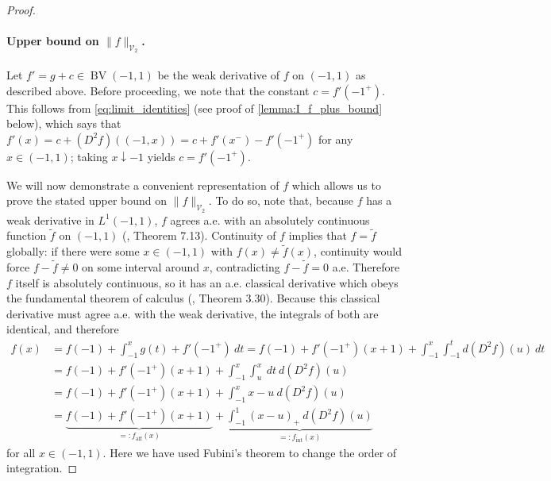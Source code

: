 \documentclass{article}
\DeclareMathOperator{\BV}{BV}
\def\cV{{\mathcal{V}}}
\begin{document}
\begin{appendices}
\begin{proof}
    \paragraph{Upper bound on $\| f \|_{\cV_2}$.} Let $f' = g+c \in \BV(-1,1)$ be the weak derivative of $f$ on $(-1,1)$ as described above. Before proceeding, we note that the constant $c = f'(-1^{+})$. This follows from \eqref{eq:limit_identities} (see proof of \cref{lemma:I_f_plus_bound} below), which says that $f'(x) = c + (D^2 f)((-1,x)) = c + f'(x^{-}) - f'(-1^{+})$ for any $x \in (-1,1)$; taking $x \downarrow -1$ yields $c = f'(-1^{+})$.

    We will now demonstrate a convenient representation of $f$ which allows us to prove the stated upper bound on $\| f \|_{\cV_2}$. To do so, note that, because $f$ has a weak derivative in $L^1(-1,1)$, $f$ agrees a.e. with an absolutely continuous function $\tilde{f}$ on $(-1,1)$ (\cite{leoni2017first}, Theorem 7.13). Continuity of $f$ implies that $f = \tilde{f}$ globally: if there were some $x \in (-1,1)$ with $f(x) \neq \tilde{f}(x)$, continuity would force $f - \tilde{f} \neq 0$ on some interval around $x$, contradicting $f - \tilde{f} = 0$ a.e.  Therefore $f$ itself is absolutely continuous, so it has an a.e. classical derivative which obeys the fundamental theorem of calculus (\cite{leoni2017first}, Theorem 3.30). Because this classical derivative must agree a.e. with the weak derivative, the integrals of both are identical, and therefore
    \begin{align} 
        f(x) &= f(-1) + \int_{-1}^x g(t) + f'(-1^{+}) \ dt = f(-1) + f'(-1^{+})(x+1) + \int_{-1}^x \int_{-1}^t  d(D^2 f)(u) \ dt \\
        &= f(-1) + f'(-1^{+})(x+1) + \int_{-1}^x \int_u^x \ dt \ d(D^2 f)(u)  \\
        &= f(-1) + f'(-1^{+})(x+1) + \int_{-1}^x x-u \ d(D^2 f)(u) \\
        &= \underbrace{f(-1) + f'(-1^{+})(x+1)}_{=: f_{\mathrm{aff}}(x)} + \underbrace{\int_{-1}^1 (x-u)_+ \ d(D^2 f)(u)}_{=: f_{\mathrm{int}}(x)} \label{eq:f_int_rep_uni}
    \end{align}
    for all $x \in (-1,1)$. Here we have used Fubini's theorem to change the order of integration.


\end{proof}
\end{appendices}
\end{document}
